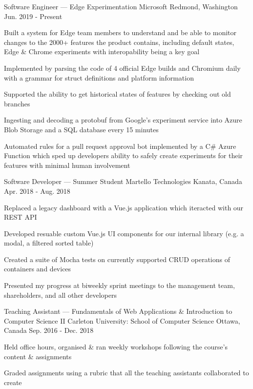 
\begin{cventries}
	\cventry
		{Software Engineer --- Edge Experimentation}
		{Microsoft}
		{Redmond, Washington}
		{Jun. 2019 - Present}
		{\begin{cvitems}
			\item Built a system for Edge team members to understand and be able to monitor changes to the 2000+ features the product contains, including default states, Edge \& Chrome experiments with interopability being a key goal
			\item Implemented by parsing the code of 4 official Edge builds and Chromium daily with a grammar for struct definitions and platform information
			\item Supported the ability to get historical states of features by checking out old branches
			\item Ingesting and decoding a protobuf from Google's experiment service into Azure Blob Storage and a SQL database every 15 minutes
			\item Automated rules for a pull request approval bot implemented by a C\# Azure Function which sped up developers ability to safely create experiments for their features with minimal human involvement
		\end{cvitems}}

	\cventry
		{Software Developer --- Summer Student}
		{Martello Technologies}
		{Kanata, Canada}
		{Apr. 2018 - Aug. 2018}
		{\begin{cvitems}
			\item Replaced a legacy dashboard with a Vue.js application which iteracted with our REST API
			\item Developed resuable custom Vue.js UI components for our internal library (e.g. a modal, a filtered sorted table)
			\item Created a suite of Mocha tests on currently supported CRUD operations of containers and devices
			\item Presented my progress at biweekly sprint meetings to the management team, shareholders, and all other developers
		\end{cvitems}}

	\cventry
		{Teaching Assistant --- Fundamentals of Web Applications \& Introduction to Computer Science II}
		{Carleton University: School of Computer Science}
		{Ottawa, Canada}
		{Sep. 2016 - Dec. 2018}
		{\begin{cvitems}
			\item Held office hours, organised \& ran weekly workshops following the course's content \& assignments
			\item Graded assignments using a rubric that all the teaching assistants collaborated to create
		\end{cvitems}}
\end{cventries}